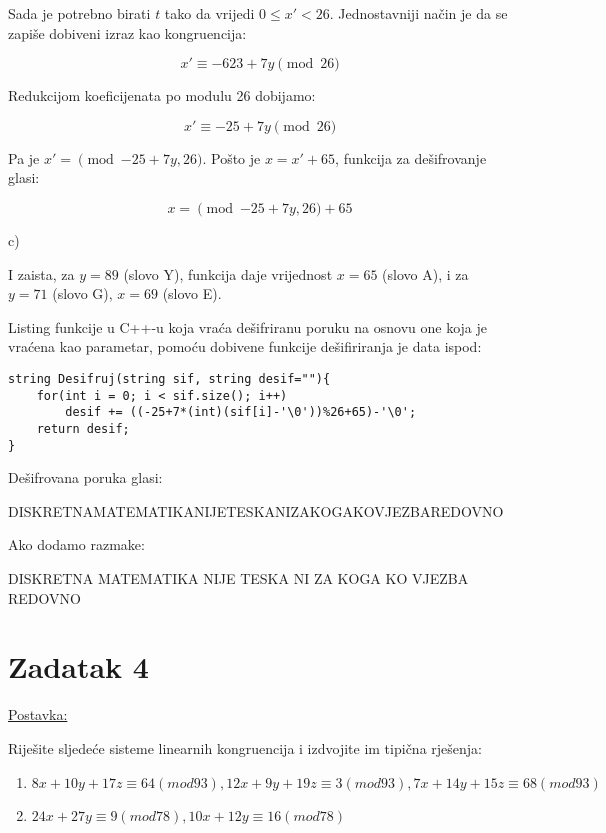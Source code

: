 \documentclass[12pt]{article}
\begin{document}
Sada je potrebno birati $t$ tako da vrijedi $0 \leq x' < 26$. Jednostavniji način je da se zapiše dobiveni izraz kao kongruencija:

$$x' \equiv -623 + 7y \pmod{26}$$\vspace{1mm}

Redukcijom koeficijenata po modulu 26 dobijamo:

$$x' \equiv -25 + 7y \pmod{26}$$\vspace{1mm}

Pa je $x' = \pmod{-25 + 7y, 26}$. Pošto je $x = x' + 65$, funkcija za dešifrovanje glasi:

$$x = \pmod{-25 + 7y, 26} + 65$$

c)

I zaista, za $y = 89$ (slovo Y), funkcija daje vrijednost $x = 65$ (slovo A), i za $y = 71$ (slovo G), $x = 69$ (slovo E).

Listing funkcije u C++-u koja vraća dešifriranu poruku na osnovu one koja je vraćena kao parametar, pomoću dobivene funkcije dešifiriranja je data ispod:\vspace{5mm}
\begin{lstlisting}
string Desifruj(string sif, string desif=""){
    for(int i = 0; i < sif.size(); i++)
        desif += ((-25+7*(int)(sif[i]-'\0'))%26+65)-'\0';
    return desif;
}
\end{lstlisting}

Dešifrovana poruka glasi:
\begin{center}
DISKRETNAMATEMATIKANIJETESKANIZAKOGAKOVJEZBAREDOVNO
\end{center}

Ako dodamo razmake:

\begin{center}
DISKRETNA MATEMATIKA NIJE TESKA NI ZA KOGA KO VJEZBA REDOVNO
\end{center}

\newpage

\section*{Zadatak 4\label{Z4}}

\underline{Postavka:}

Riješite sljedeće sisteme linearnih kongruencija i izdvojite im tipična rješenja:

\begin{enumerate}
\item $8 x + 10 y + 17 z \equiv 64 (mod 93), 12 x + 9 y + 19 z \equiv 3 (mod 93), 7 x + 14 y + 15 z \equiv 68 (mod 93)$
\item $24 x + 27 y \equiv 9 (mod 78), 10 x + 12 y \equiv 16 (mod 78)$
\end{enumerate}
\end{document}
